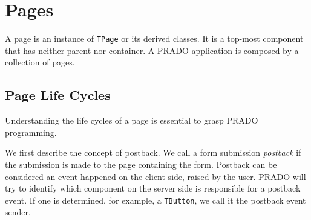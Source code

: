 \documentclass{book}
\begin{document}
\section{Pages}

A page is an instance of \verb|TPage| or its derived classes. It
is a top-most component that has neither parent nor container. A
PRADO application is composed by a collection of pages.


\subsection{Page Life Cycles}

Understanding the life cycles of a page is essential to grasp
PRADO programming.


We first describe the concept of postback. We call a form
submission \emph{postback} if the submission is made to the page
containing the form. Postback can be considered an event happened
on the client side, raised by the user. PRADO will try to identify
which component on the server side is responsible for a postback
event. If one is determined, for example, a \verb|TButton|, we
call it the postback event sender.
\end{document}
